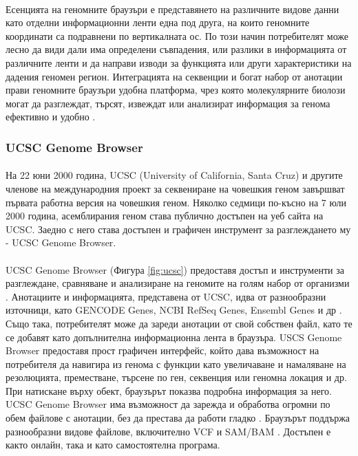 \documentclass[pdftex,cyrillic,14pt,a4page,twoside,openright]{extreport}
\begin{document}
\paragraph{}
Есенцията на геномните браузъри е представянето на различните видове данни като отделни информационни ленти една под друга, на които геномните координати са подравнени по вертикалната ос. По този начин потребителят може лесно да види дали има определени съвпадения, или разлики в информацията от различните ленти и да направи изводи за функцията или други характеристики на дадения геномен регион. Интеграцията на секвенции и богат набор от анотации прави геномните браузъри удобна платформа, чрез която молекулярните биолози могат да разглеждат, търсят, извеждат или анализират информация за генома ефективно и удобно \cite{wang2013brief}.

\subsubsection{UCSC Genome Browser}
\paragraph{}
На 22 юни 2000 година, UCSC (University of California, Santa Cruz) и другите членове на международния проект за секвениране на човешкия геном завършват първата работна версия на човешкия геном. Няколко седмици по-късно на 7 юли 2000 година, асемблирания геном става публично достъпен на уеб сайта на UCSC. Заедно с него става достъпен и графичен инструмент за разглеждането му - UCSC Genome Browser.

\paragraph{}
UCSC Genome Browser (Фигура \ref{fig:ucsc}) предоставя достъп и инструменти за разглеждане, сравняване и анализиране на геномите на голям набор от организми \cite{fujita2011}. Анотациите и информацията, представена от UCSC, идва от разнообразни източници, като GENCODE Genes, NCBI RefSeq Genes, Ensembl Genes и др \cite{navarro2021}. Също така, потребителят може да зареди анотации от свой собствен файл, като те се добавят като допълнителна информационна лента в браузъра. USCS Genome Browser предоставя прост графичен интерфейс, който дава възможност на потребителя да навигира из генома с функции като увеличаване и намаляване на резолюцията, преместване, търсене по ген, секвенция или геномна локация и др. При натискане върху обект, браузърът показва подробна информация за него. UCSC Genome Browser има възможност да зарежда и обработва огромни по обем файлове с анотации, без да престава да работи гладко \cite{kent2002human}. Браузърът поддържа разнообразни видове файлове, включително VCF \cite{navarro2021} и SAM/BAM \cite{fujita2011}. Достъпен е както онлайн, така и като самостоятелна програма.
\end{document}
